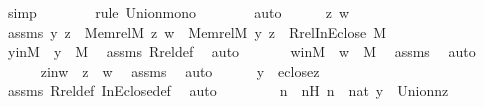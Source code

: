 \begin{isabellebody}
\ simp\ \isanewline
\ \ \ \ \ \ \isamarkupfalse%
{\isacharparenleft}{\kern0pt}rule\ Union{\isacharunderscore}{\kern0pt}mono{\isacharparenright}{\kern0pt}\isanewline
\ \ \ \ \ \ \isamarkupfalse%
\ auto\isanewline
\isanewline
\ \ \ \ \isamarkupfalse%
\ z\ w\ \isanewline
\ \ \ \ \isamarkupfalse%
\ assms{}{\isacharcolon}{\kern0pt}\ {\isachardoublequoteopen}{\isacharless}{\kern0pt}y{\isacharcomma}{\kern0pt}\ z{\isachargreater}{\kern0pt}\ {\isasymin}\ Memrel{\isacharparenleft}{\kern0pt}M{\isacharparenright}{\kern0pt}{\isacharcircum}{\kern0pt}{\isacharplus}{\kern0pt}{\isachardoublequoteclose}\ {\isachardoublequoteopen}{\isacharless}{\kern0pt}z{\isacharcomma}{\kern0pt}\ w{\isachargreater}{\kern0pt}\ {\isasymin}\ Memrel{\isacharparenleft}{\kern0pt}M{\isacharparenright}{\kern0pt}{\isachardoublequoteclose}\ {\isachardoublequoteopen}{\isacharless}{\kern0pt}y{\isacharcomma}{\kern0pt}\ z{\isachargreater}{\kern0pt}\ {\isasymin}\ Rrel{\isacharparenleft}{\kern0pt}InEclose{\isacharcomma}{\kern0pt}\ M{\isacharparenright}{\kern0pt}{\isachardoublequoteclose}\ \isanewline
\isanewline
\ \ \ \ \isamarkupfalse%
\ yinM\ {\isacharcolon}{\kern0pt}\ {\isachardoublequoteopen}y\ {\isasymin}\ M{\isachardoublequoteclose}\ \isamarkupfalse%
\ assms{}\ Rrel{\isacharunderscore}{\kern0pt}def\ \isamarkupfalse%
\ auto\ \isanewline
\ \ \ \ \isamarkupfalse%
\ winM\ {\isacharcolon}{\kern0pt}\ {\isachardoublequoteopen}w\ {\isasymin}\ M{\isachardoublequoteclose}\ \isamarkupfalse%
\ assms{}\ \isamarkupfalse%
\ auto\isanewline
\ \ \ \ \isamarkupfalse%
\ zinw\ {\isacharcolon}{\kern0pt}\ {\isachardoublequoteopen}z\ {\isasymin}\ w{\isachardoublequoteclose}\ \isamarkupfalse%
\ assms{}\ \isamarkupfalse%
\ auto\isanewline
\isanewline
\ \ \ \ \isamarkupfalse%
\ {\isachardoublequoteopen}y\ {\isasymin}\ eclose{\isacharparenleft}{\kern0pt}z{\isacharparenright}{\kern0pt}{\isachardoublequoteclose}\ \isamarkupfalse%
\ assms{}\ Rrel{\isacharunderscore}{\kern0pt}def\ InEclose{\isacharunderscore}{\kern0pt}def\ \isamarkupfalse%
\ auto\ \isanewline
\ \ \ \ \isamarkupfalse%
\ \isamarkupfalse%
\ n\ \ nH{\isacharcolon}{\kern0pt}\ {\isachardoublequoteopen}n\ {\isasymin}\ nat{\isachardoublequoteclose}\ {\isachardoublequoteopen}y\ {\isasymin}\ Union{\isacharcircum}{\kern0pt}n{\isacharparenleft}{\kern0pt}z{\isacharparenright}{\kern0pt}{\isachardoublequoteclose}\ \isamarkupfalse%

\end{isabellebody}
